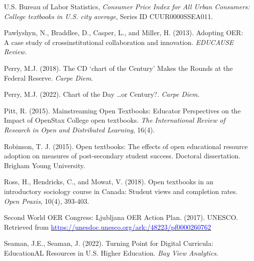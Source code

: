 \documentclass[11pt]{article}
\newcommand{\alink}[2]{\href{#1}{\textcolor{blue}{#2}}}
\begin{document}
\begin{thebibliography}{99}
   U.S. Bureau of Labor Statistics, {\em Consumer Price Index for All Urban Consumers: College textbooks in U.S. city average}, Series ID CUUR0000SSEA011.%

   Pawlyshyn, N., Braddlee, D., Casper, L., and Miller, H. (2013). Adopting OER: A case study of crossinstitutional collaboration and innovation. {\em EDUCAUSE Review}.

   Perry, M.J. (2018). The CD `chart of the Century' Makes the Rounds at the Federal Reserve. {\em Carpe Diem}.%

   Perry, M.J. (2022). Chart of the Day \ldots or Century?. {\em Carpe Diem}.%

   Pitt, R. (2015). Mainstreaming Open Textbooks: Educator Perspectives on the Impact of OpenStax College open textbooks. {\em The International Review of Research in Open and Distributed Learning}, 16(4).

   Robinson, T. J. (2015). Open textbooks: The effects of open educational resource adoption on measures of post-secondary student success. Doctoral dissertation. Brigham Young University.

   Ross, H., Hendricks, C., and Mowat, V. (2018). Open textbooks in an introductory sociology course in Canada: Student views and completion rates. {\em Open Praxis}, 10(4), 393-403.

   Second World OER Congress: Ljubljana OER Action Plan. (2017). UNESCO. \newline Retrieved from \alink{https://unesdoc.unesco.org/ark:/48223/pf0000260762}{https://unesdoc.unesco.org/ark:/48223/pf0000260762}

   Seaman, J.E., Seaman, J. (2022). Turning Point for Digital Curricula: EducationAL Resources in U.S. Higher Education. {\em Bay View Analytics}.%


\end{thebibliography}
\end{document}
